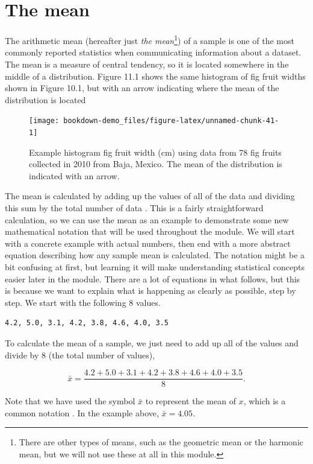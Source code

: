 \documentclass[
]{scrbook}
\begin{document}
\hypertarget{the-mean}{%
\section{The mean}\label{the-mean}}

The arithmetic mean (hereafter just \emph{the mean}\footnote{There are other types of means, such as the geometric mean or the harmonic mean, but we will not use these at all in this module.}) of a sample is one of the most commonly reported statistics when communicating information about a dataset.
The mean is a measure of central tendency, so it is located somewhere in the middle of a distribution.
Figure 11.1 shows the same histogram of fig fruit widths shown in Figure 10.1, but with an arrow indicating where the mean of the distribution is located

\begin{figure}
\texttt{[image: bookdown-demo\_files/figure-latex/unnamed-chunk-41-1]} \caption{Example histogram fig fruit width (cm) using data from 78 fig fruits collected in 2010 from Baja, Mexico. The mean of the distribution is indicated with an arrow.}\label{fig:unnamed-chunk-41}
\end{figure}

The mean is calculated by adding up the values of all of the data and dividing this sum by the total number of data \citep{Sokal1995}.
This is a fairly straightforward calculation, so we can use the mean as an example to demonstrate some new mathematical notation that will be used throughout the module.
We will start with a concrete example with actual numbers, then end with a more abstract equation describing how any sample mean is calculated.
The notation might be a bit confusing at first, but learning it will make understanding statistical concepts easier later in the module.
There are a lot of equations in what follows, but this is because we want to explain what is happening as clearly as possible, step by step.
We start with the following 8 values.

\begin{verbatim}
4.2, 5.0, 3.1, 4.2, 3.8, 4.6, 4.0, 3.5
\end{verbatim}

To calculate the mean of a sample, we just need to add up all of the values and divide by 8 (the total number of values),

\[\bar{x} = \frac{4.2 + 5.0 + 3.1 + 4.2 + 3.8 + 4.6 + 4.0 + 3.5}{8}.\]

Note that we have used the symbol \(\bar{x}\) to represent the mean of \(x\), which is a common notation \citep{Sokal1995}.
In the example above, \(\bar{x} = 4.05\).
\end{document}
